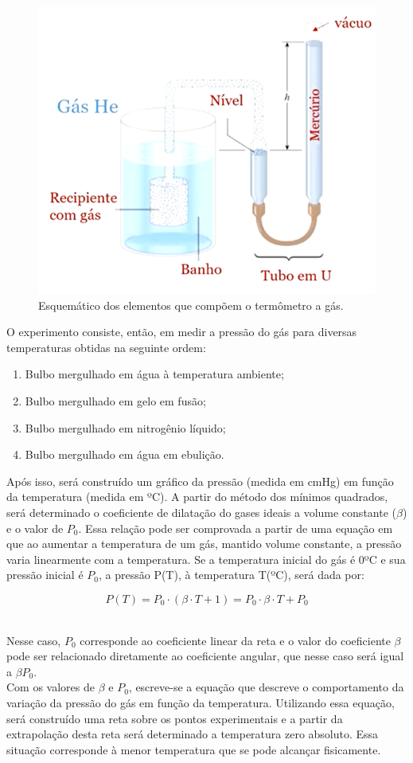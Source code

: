 \begin{figure}[H]
  \centering
  \includegraphics[scale=0.75]{images/Termômetro a Gás esquemático.png}
  \caption{Esquemático dos elementos que compõem o termômetro a gás.}
\end{figure}

O experimento consiste, então, em medir a pressão do gás para diversas temperaturas obtidas na seguinte ordem:

\begin{enumerate}
    \item Bulbo mergulhado em água à temperatura ambiente;
    \item Bulbo mergulhado em gelo em fusão;
    \item Bulbo mergulhado em nitrogênio líquido;
    \item Bulbo mergulhado em água em ebulição.
\end{enumerate}

Após isso, será construído um gráfico da pressão (medida em cmHg) em função da temperatura (medida em ºC). A partir do método dos mínimos quadrados, será determinado o coeficiente de dilatação do gases ideais a volume constante ($\beta$) e o valor de $P_0$. Essa relação pode ser comprovada a partir de uma equação em que ao aumentar a temperatura de um gás, mantido volume constante, a pressão varia linearmente com a temperatura. Se a temperatura inicial do gás é 0ºC e sua pressão inicial é $P_0$, a pressão P(T), à temperatura T(ºC), será dada por:

\[ P(T) = P_0 \cdot (\beta \cdot T + 1) = P_0 \cdot \beta \cdot T + P_0 \]\

Nesse caso, $P_0$ corresponde ao coeficiente linear da reta e o valor do coeficiente $\beta$ pode ser relacionado diretamente ao coeficiente angular, que nesse caso será igual a $\beta P_0$.\\

Com os valores de $\beta$ e $P_0$, escreve-se a equação que descreve o comportamento da variação da pressão do gás em função da temperatura. Utilizando essa equação, será construído uma reta sobre os pontos experimentais e a partir da extrapolação desta reta será determinado a temperatura zero absoluto. Essa situação corresponde à menor temperatura que se pode alcançar fisicamente.
